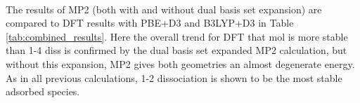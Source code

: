 \documentclass[11pt,DIV=13,BCOR=5mm,a4paper,headinclude]{scrbook}
\begin{document}
 \\
The results of MP2 (both with and without dual basis set expansion) are compared to DFT results with PBE+D3 and B3LYP+D3 in Table \ref{tab:combined_results}.
Here the overall trend for DFT that mol is more stable than 1-4 diss is confirmed by the dual basis set expanded MP2 calculation, but without this expansion, MP2 gives both geometries an almost degenerate energy.
As in all previous calculations, 1-2 dissociation is shown to be the most stable  adsorbed species.
 
\end{document}
